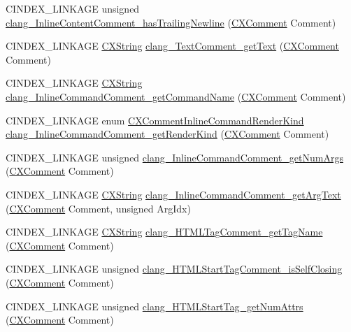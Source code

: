 \begin{DoxyCompactItemize}
C\+I\+N\+D\+E\+X\+\_\+\+L\+I\+N\+K\+A\+GE unsigned \hyperlink{group__CINDEX__COMMENT_gacbc2924271ca86226c024e859e0a75c8}{clang\+\_\+\+Inline\+Content\+Comment\+\_\+has\+Trailing\+Newline} (\hyperlink{structCXComment}{C\+X\+Comment} Comment)
\item 
C\+I\+N\+D\+E\+X\+\_\+\+L\+I\+N\+K\+A\+GE \hyperlink{structCXString}{C\+X\+String} \hyperlink{group__CINDEX__COMMENT_gae9a27e851356181beac36bbff6e638e2}{clang\+\_\+\+Text\+Comment\+\_\+get\+Text} (\hyperlink{structCXComment}{C\+X\+Comment} Comment)
\item 
C\+I\+N\+D\+E\+X\+\_\+\+L\+I\+N\+K\+A\+GE \hyperlink{structCXString}{C\+X\+String} \hyperlink{group__CINDEX__COMMENT_ga77f5b160e7d73190ac518298c1e79d05}{clang\+\_\+\+Inline\+Command\+Comment\+\_\+get\+Command\+Name} (\hyperlink{structCXComment}{C\+X\+Comment} Comment)
\item 
C\+I\+N\+D\+E\+X\+\_\+\+L\+I\+N\+K\+A\+GE enum \hyperlink{group__CINDEX__COMMENT_ga23efacd9c1e4e286a9f9714e1720fdcf}{C\+X\+Comment\+Inline\+Command\+Render\+Kind} \hyperlink{group__CINDEX__COMMENT_ga3dd54ce1288d09c408cac8c887da2ebd}{clang\+\_\+\+Inline\+Command\+Comment\+\_\+get\+Render\+Kind} (\hyperlink{structCXComment}{C\+X\+Comment} Comment)
\item 
C\+I\+N\+D\+E\+X\+\_\+\+L\+I\+N\+K\+A\+GE unsigned \hyperlink{group__CINDEX__COMMENT_ga78db1049239be9649c2829cdeb83c544}{clang\+\_\+\+Inline\+Command\+Comment\+\_\+get\+Num\+Args} (\hyperlink{structCXComment}{C\+X\+Comment} Comment)
\item 
C\+I\+N\+D\+E\+X\+\_\+\+L\+I\+N\+K\+A\+GE \hyperlink{structCXString}{C\+X\+String} \hyperlink{group__CINDEX__COMMENT_ga6824f3cdcb42edbd143db77a657fe888}{clang\+\_\+\+Inline\+Command\+Comment\+\_\+get\+Arg\+Text} (\hyperlink{structCXComment}{C\+X\+Comment} Comment, unsigned Arg\+Idx)
\item 
C\+I\+N\+D\+E\+X\+\_\+\+L\+I\+N\+K\+A\+GE \hyperlink{structCXString}{C\+X\+String} \hyperlink{group__CINDEX__COMMENT_ga55b84483c67c0629260b1534d4b3f80e}{clang\+\_\+\+H\+T\+M\+L\+Tag\+Comment\+\_\+get\+Tag\+Name} (\hyperlink{structCXComment}{C\+X\+Comment} Comment)
\item 
C\+I\+N\+D\+E\+X\+\_\+\+L\+I\+N\+K\+A\+GE unsigned \hyperlink{group__CINDEX__COMMENT_ga052be5f208a0ef2f76e3e9923a96ef19}{clang\+\_\+\+H\+T\+M\+L\+Start\+Tag\+Comment\+\_\+is\+Self\+Closing} (\hyperlink{structCXComment}{C\+X\+Comment} Comment)
\item 
C\+I\+N\+D\+E\+X\+\_\+\+L\+I\+N\+K\+A\+GE unsigned \hyperlink{group__CINDEX__COMMENT_gaffb8098debd5b99c2345840a5f0e63e0}{clang\+\_\+\+H\+T\+M\+L\+Start\+Tag\+\_\+get\+Num\+Attrs} (\hyperlink{structCXComment}{C\+X\+Comment} Comment)

\end{DoxyCompactItemize}

